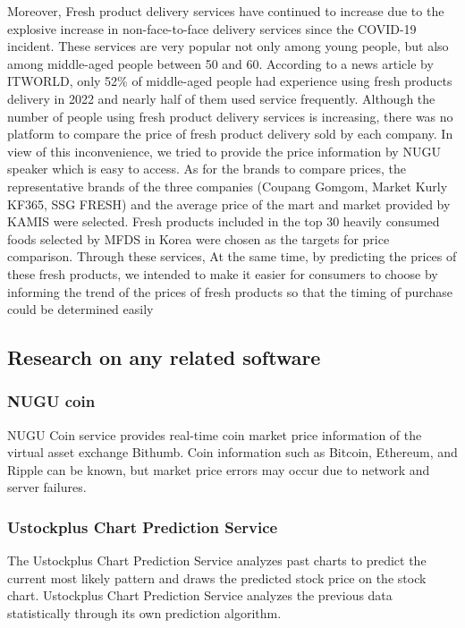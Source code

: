 \documentclass[conference]{IEEEtran}
\begin{document}
    Moreover, Fresh product delivery services have continued to increase due to the explosive increase in non-face-to-face delivery services since the COVID-19 incident. These services are very popular not only among young people, but also among middle-aged people between 50 and 60. According to a news article by ITWORLD, only 52\% of middle-aged people had experience using fresh products delivery in 2022 and nearly half of them used service frequently. Although the number of people using fresh product delivery services is increasing, there was no platform to compare the price of fresh product delivery sold by each company. In view of this inconvenience, we tried to provide the price information by NUGU speaker which is easy to access. As for the brands to compare prices, the representative brands of the three companies (Coupang Gomgom, Market Kurly KF365, SSG FRESH) and the average price of the mart and market provided by KAMIS were selected. Fresh products included in the top 30 heavily consumed foods selected by MFDS in Korea were chosen as the targets for price comparison. Through these services, At the same time, by predicting the prices of these fresh products, we intended to make it easier for consumers to choose by informing the trend of the prices of fresh products so that the timing of purchase could be determined easily



\subsection{Research on any related software}
\subsubsection{NUGU coin}

NUGU Coin service provides real-time coin market price information of the virtual asset exchange Bithumb. Coin information such as Bitcoin, Ethereum, and Ripple can be known, but market price errors may occur due to network and server failures.
\subsubsection{Ustockplus Chart Prediction Service}
The Ustockplus Chart Prediction Service analyzes past charts to predict the current most likely pattern and draws the predicted stock price on the stock chart. Ustockplus Chart Prediction Service analyzes the previous data statistically through its own prediction algorithm.
\end{document}
